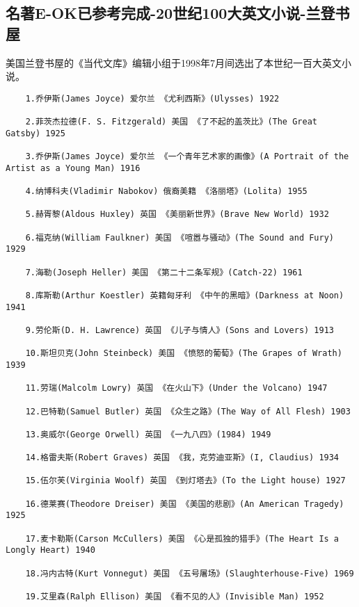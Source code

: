 \documentclass[UTF8]{../../RepresentationUniverse}
\begin{document}
\subsection{名著E-OK已参考完成-20世纪100大英文小说-兰登书屋}
美国兰登书屋的《当代文库》编辑小组于1998年7月间选出了本世纪一百大英文小说。
\begin{lstlisting}
    1.乔伊斯(James Joyce) 爱尔兰 《尤利西斯》(Ulysses) 1922

    2.菲茨杰拉德(F. S. Fitzgerald) 美国 《了不起的盖茨比》(The Great Gatsby) 1925
    
    3.乔伊斯(James Joyce) 爱尔兰 《一个青年艺术家的画像》(A Portrait of the Artist as a Young Man) 1916
    
    4.纳博科夫(Vladimir Nabokov) 俄裔美籍 《洛丽塔》(Lolita) 1955
    
    5.赫胥黎(Aldous Huxley) 英国 《美丽新世界》(Brave New World) 1932
    
    6.福克纳(William Faulkner) 美国 《喧嚣与骚动》(The Sound and Fury) 1929
    
    7.海勒(Joseph Heller) 美国 《第二十二条军规》(Catch-22) 1961
    
    8.库斯勒(Arthur Koestler) 英籍匈牙利 《中午的黑暗》(Darkness at Noon) 1941
    
    9.劳伦斯(D. H. Lawrence) 英国 《儿子与情人》(Sons and Lovers) 1913
    
    10.斯坦贝克(John Steinbeck) 美国 《愤怒的葡萄》(The Grapes of Wrath) 1939
    
    11.劳瑞(Malcolm Lowry) 英国 《在火山下》(Under the Volcano) 1947
    
    12.巴特勒(Samuel Butler) 英国 《众生之路》(The Way of All Flesh) 1903
    
    13.奥威尔(George Orwell) 英国 《一九八四》(1984) 1949
    
    14.格雷夫斯(Robert Graves) 英国 《我，克劳迪亚斯》(I, Claudius) 1934
    
    15.伍尔芙(Virginia Woolf) 英国 《到灯塔去》(To the Light house) 1927
    
    16.德莱赛(Theodore Dreiser) 美国 《美国的悲剧》(An American Tragedy) 1925
    
    17.麦卡勒斯(Carson McCullers) 美国 《心是孤独的猎手》(The Heart Is a Longly Heart) 1940
    
    18.冯内古特(Kurt Vonnegut) 美国 《五号屠场》(Slaughterhouse-Five) 1969
    
    19.艾里森(Ralph Ellison) 美国 《看不见的人》(Invisible Man) 1952
    

\end{lstlisting}
\end{document}
